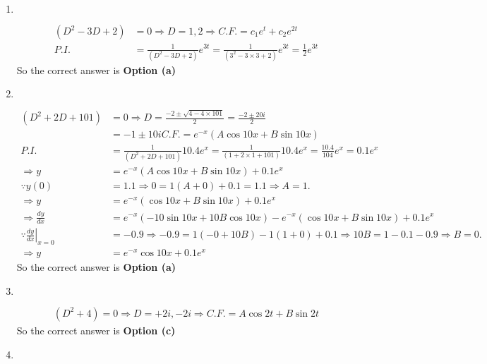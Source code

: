 \begin{enumerate}
\begin{answer}
\end{answer}
\item $\left. \right. $
\begin{answer}
	\begin{align*}
	\left(D^{2}-3 D+2\right)&=0 \Rightarrow D=1,2 \Rightarrow C . F .=c_{1} e^{t}+c_{2} e^{2 t}\\
	P . I .&=\frac{1}{\left(D^{2}-3 D+2\right)} e^{3 t}=\frac{1}{\left(3^{2}-3 \times 3+2\right)} e^{3 t}=\frac{1}{2} e^{3 t}
	\end{align*}
		So the correct answer is \textbf{Option (a)}
\end{answer}
\item $\left. \right. $
\begin{answer}
	\begin{align*}
	\left(D^{2}+2 D+101\right)&=0 \Rightarrow D=\frac{-2 \pm \sqrt{4-4 \times 101}}{2}=\frac{-2 \pm 20 i}{2}\\&=-1 \pm 10 iC.F. =e^{-x}(A \cos 10 x+B \sin 10 x)\\
	P.I. &=\frac{1}{\left(D^{2}+2 D+101\right)} 10.4 e^{x}=\frac{1}{(1+2 \times 1+101)} 10.4 e^{x}=\frac{10.4}{104} e^{x}=0.1 e^{x}\\
	\Rightarrow y&=e^{-x}(A \cos 10 x+B \sin 10 x)+0.1 e^{x}\\
	\because y(0)&=1.1 \Rightarrow 0=1(A+0)+0.1=1.1 \Rightarrow A=1 .\\
	\Rightarrow y&=e^{-x}(\cos 10 x+B \sin 10 x)+0.1 e^{x}\\
	\Rightarrow \frac{d y}{d x}&=e^{-x}(-10 \sin 10 x+10 B \cos 10 x)-e^{-x}(\cos 10 x+B \sin 10 x)+0.1 e^{x}\\
	\left.\because \frac{d y}{d x}\right|_{x=0}&=-0.9 \Rightarrow-0.9=1(-0+10 B)-1(1+0)+0.1 \Rightarrow 10 B=1-0.1-0.9 \Rightarrow B=0 .\\
	\Rightarrow y&=e^{-x} \cos 10 x+0.1 e^{x}
	\end{align*}
		So the correct answer is \textbf{Option (a)}
\end{answer}
\item $\left. \right. $
\begin{answer}
	\begin{align*}
	\left(D^{2}+4\right)=0 \Rightarrow D=+2 i,-2 i \Rightarrow C . F .=A \cos 2 t+B \sin 2 t
	\end{align*}
	So the correct answer is \textbf{Option (c)}
\end{answer}
\item $\left. \right. $
\begin{answer}
	\begin{align*}

\end{align*}
\end{answer}
\end{enumerate}
